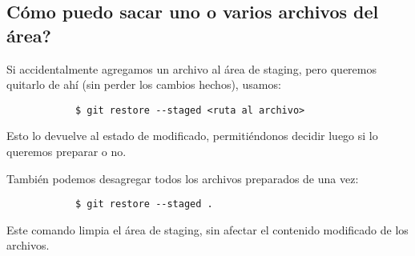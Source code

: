     \subsection{Cómo puedo sacar uno o varios archivos del área?}
        Si accidentalmente agregamos un archivo al \'area de staging, pero queremos quitarlo de ah\'i (sin perder los cambios hechos), usamos:
        \begin{lstlisting}
            $ git restore --staged <ruta al archivo>
        \end{lstlisting}
        Esto lo devuelve al estado de modificado, permiti\'endonos decidir luego si lo queremos preparar o no.

        También podemos desagregar todos los archivos preparados de una vez:
        \begin{lstlisting}
            $ git restore --staged .
        \end{lstlisting}
        Este comando limpia el \'area de staging, sin afectar el contenido modificado de los archivos.